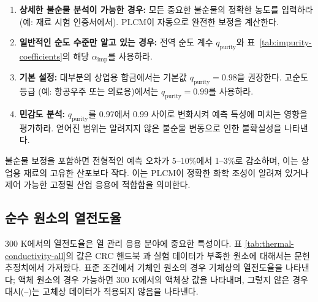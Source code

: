 \documentclass[12pt,a4paper]{article}
\begin{document}
	\begin{enumerate}
		\item \textbf{상세한 불순물 분석이 가능한 경우:} 모든 중요한 불순물의 정확한 농도를 입력하라 (예: 재료 시험 인증서에서). PLCM이 자동으로 완전한 보정을 계산한다.
		\item \textbf{일반적인 순도 수준만 알고 있는 경우:} 전역 순도 계수 \(q_{\mathrm{purity}}\)와 표~\ref{tab:impurity-coefficients}의 해당 \(\alpha_{\mathrm{imp}}\)를 사용하라.
		\item \textbf{기본 설정:} 대부분의 상업용 합금에서는 기본값 \(q_{\mathrm{purity}} = 0.98\)을 권장한다. 고순도 등급 (예: 항공우주 또는 의료용)에서는 \(q_{\mathrm{purity}} = 0.99\)를 사용하라.
		\item \textbf{민감도 분석:} \(q_{\mathrm{purity}}\)를 0.97에서 0.99 사이로 변화시켜 예측 특성에 미치는 영향을 평가하라. 얻어진 범위는 알려지지 않은 불순물 변동으로 인한 불확실성을 나타낸다.
	\end{enumerate}
	
	불순물 보정을 포함하면 전형적인 예측 오차가 5–10\%에서 1–3\%로 감소하며, 이는 상업용 재료의 고유한 산포보다 작다. 이는 PLCM이 정확한 화학 조성이 알려져 있거나 제어 가능한 고정밀 산업 응용에 적합함을 의미한다.
	
	\subsection{순수 원소의 열전도율}
	\label{subsec:thermal-conductivity-elements}
	
	300 K에서의 열전도율은 열 관리 응용 분야에 중요한 특성이다. 표 \ref{tab:thermal-conductivity-all}의 값은 CRC 핸드북 \cite{CRC}과 실험 데이터가 부족한 원소에 대해서는 문헌 추정치에서 가져왔다. 표준 조건에서 기체인 원소의 경우 기체상의 열전도율을 나타낸다; 액체 원소의 경우 가능하면 300 K에서의 액체상 값을 나타내며, 그렇지 않은 경우 대시(–)는 고체상 데이터가 적용되지 않음을 나타낸다.
	
\end{document}
